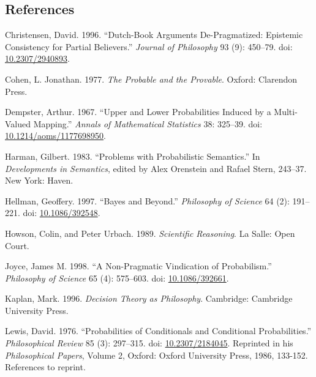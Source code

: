 \documentclass[
  10pt,
  letterpaper,
  DIV=11,
  numbers=noendperiod,
  twoside]{scrartcl}
\newlength{\cslhangindent}
\newenvironment{CSLReferences}[2] %
 {\begin{list}{}{%
  \setlength{\itemindent}{0pt}
  \setlength{\leftmargin}{0pt}
  \setlength{\parsep}{0pt}
  \ifodd #1
   \setlength{\leftmargin}{\cslhangindent}
   \setlength{\itemindent}{-1\cslhangindent}
  \fi
  \setlength{\itemsep}{#2\baselineskip}}}
 {\end{list}}
\begin{document}
\subsection*{References}\label{references}

\label{refs}
\begin{CSLReferences}{1}{0}
Christensen, David. 1996. {``Dutch-Book Arguments {D}e-Pragmatized:
Epistemic Consistency for Partial Believers.''} \emph{Journal of
Philosophy} 93 (9): 450--79. doi:
\href{https://doi.org/10.2307/2940893}{10.2307/2940893}.

Cohen, L. Jonathan. 1977. \emph{The Probable and the Provable}. Oxford:
Clarendon Press.

Dempster, Arthur. 1967. {``Upper and Lower Probabilities Induced by a
Multi-Valued Mapping.''} \emph{Annals of Mathematical Statistics} 38:
325--39. doi:
\href{https://doi.org/10.1214/aoms/1177698950}{10.1214/aoms/1177698950}.

Harman, Gilbert. 1983. {``Problems with Probabilistic Semantics.''} In
\emph{Developments in Semantics}, edited by Alex Orenstein and Rafael
Stern, 243--37. New York: Haven.

Hellman, Geoffery. 1997. {``Bayes and Beyond.''} \emph{Philosophy of
Science} 64 (2): 191--221. doi:
\href{https://doi.org/10.1086/392548}{10.1086/392548}.

Howson, Colin, and Peter Urbach. 1989. \emph{Scientific Reasoning}. La
Salle: Open Court.

Joyce, James M. 1998. {``A Non-Pragmatic Vindication of Probabilism.''}
\emph{Philosophy of Science} 65 (4): 575--603. doi:
\href{https://doi.org/10.1086/392661}{10.1086/392661}.

Kaplan, Mark. 1996. \emph{Decision Theory as Philosophy}. Cambridge:
Cambridge University Press.

Lewis, David. 1976. {``Probabilities of Conditionals and Conditional
Probabilities.''} \emph{Philosophical Review} 85 (3): 297--315. doi:
\href{https://doi.org/10.2307/2184045}{10.2307/2184045}. Reprinted in
his \emph{Philosophical Papers}, Volume 2, Oxford: Oxford University
Press, 1986, 133-152. References to reprint.


\end{CSLReferences}
\end{document}

